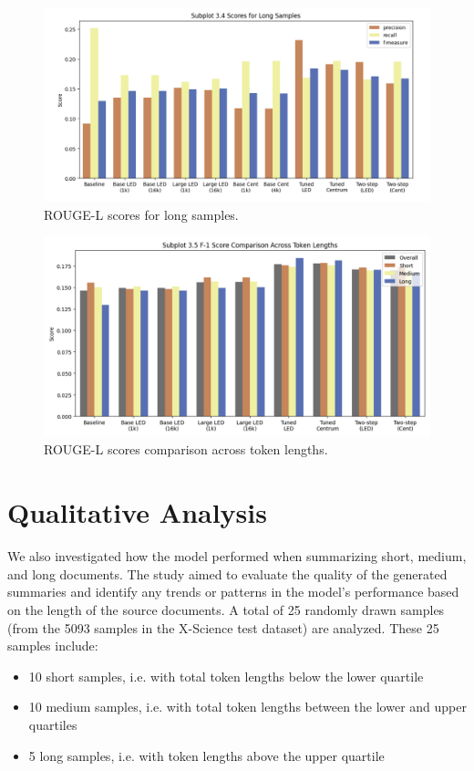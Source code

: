 \documentclass[12pt, twocolumn]{article}
\numberwithin{equation}{section}
\begin{document}
\begin{figure}
    \includegraphics[width=\textwidth]{long.png}
    \caption{ROUGE-L scores for long samples.}
    \label{fig:long}
\end{figure}

\begin{figure}
    \includegraphics[width=\textwidth]{various_lengths.png}
    \caption{ROUGE-L scores comparison across token lengths.}
    \label{fig:various-length}
\end{figure}

\section{Qualitative Analysis}
\label{sec:qualitative}

We also investigated how the model performed when summarizing short, medium, and long documents. The study aimed to evaluate the quality of the generated summaries and identify any trends or patterns in the model's performance based on the length of the source documents. A total of 25 randomly drawn samples (from the 5093 samples in the X-Science test dataset) are analyzed.  These 25 samples include:

\begin{itemize}
    \item 10 short samples, i.e. with total token lengths below the lower quartile
    \item 10 medium samples, i.e. with total token lengths between the lower and upper quartiles
    \item 5 long samples, i.e. with token lengths above the upper quartile
\end{itemize}
\end{document}
